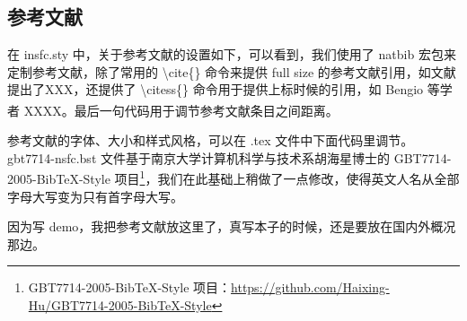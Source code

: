 \documentclass[a4paper,zihao=-4]{article}
\newcommand{\citess}[1]{\textsuperscript{\cite{#1}}}
\newcommand{\kaishu}{}
\newcommand{\songti}{}
\newcommand{\zihao}[1]{\fontsize{12pt}{0}}
\begin{document}
\begin{CJK*}{UTF8}{gbsn}





\subsection{参考文献}
在 insfc.sty 中，关于参考文献的设置如下，可以看到，我们使用了 natbib 宏包来定制参考文献，除了常用的 \textbackslash cite\{\} 命令来提供 full size 的参考文献引用，如文献\cite{li2014object}提出了XXX，还提供了 \textbackslash citess\{\} 命令用于提供上标时候的引用，如 Bengio 等学者\citess{bengio2013representation} XXXX。最后一句代码用于调节参考文献条目之间距离。


参考文献的字体、大小和样式风格，可以在 .tex 文件中下面代码里调节。gbt7714-nsfc.bst 文件基于南京大学计算机科学与技术系胡海星博士的 GBT7714-2005-BibTeX-Style 项目\footnote{GBT7714-2005-BibTeX-Style 项目：\href{https://github.com/Haixing-Hu/GBT7714-2005-BibTeX-Style}{https://github.com/Haixing-Hu/GBT7714-2005-BibTeX-Style}}，我们在此基础上稍做了一点修改，使得英文人名从全部字母大写变为只有首字母大写。

% 		
% 		

因为写 demo，我把参考文献放这里了，真写本子的时候，还是要放在国内外概况那边。


\end{CJK*}
\end{document}
